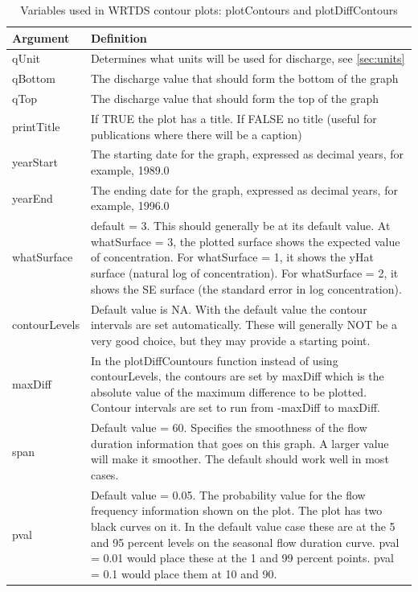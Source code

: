 \documentclass[a4paper,11pt]{article}\usepackage{graphicx, color}
\begin{document}
\begin{table}[ht]
\caption{Variables used in WRTDS contour plots: plotContours and plotDiffContours \label{tab:wrtdsContourVariables}}
\begin{tabularx}{\textwidth}{lX}
\hline
  \textbf{Argument} & \textbf{Definition} \\
\hline
qUnit & Determines what units will be used for discharge, see \ref{sec:units}\\
qBottom & The discharge value that should form the bottom of the graph \\
qTop & The discharge value that should form the top of the graph \\
printTitle & If TRUE the plot has a title.  If FALSE no title (useful for publications where there will be a caption) \\
yearStart & The starting date for the graph, expressed as decimal years, for example, 1989.0 \\
yearEnd & The ending date for the graph, expressed as decimal years, for example, 1996.0 \\
whatSurface & default = 3.  This should generally be at its default value.  At whatSurface = 3, the plotted surface shows the expected value of concentration.  For whatSurface = 1, it shows the yHat surface (natural log of concentration).  For whatSurface = 2, it shows the SE surface (the standard error in log concentration).    \\
contourLevels & Default value is NA.  With the default value the contour intervals are set automatically.  These will generally NOT be a very good choice, but they may provide a starting point.  \\
maxDiff & In the plotDiffCountours function instead of using contourLevels, the contours are set by maxDiff which is the absolute value of the maximum difference to be plotted.  Contour intervals are set to run from -maxDiff to maxDiff.\\
span & Default value = 60.  Specifies the smoothness of the flow duration information that goes on this graph.  A larger value will make it smoother.  The default should work well in most cases.\\
pval & Default value = 0.05.  The probability value for the flow frequency information shown on the plot.  The plot has two black curves on it.  In the default value case these are at the 5 and 95 percent levels on the seasonal flow duration curve.  pval = 0.01 would place these at the 1 and 99 percent points.  pval = 0.1 would place them at 10  and 90.\\

\end{tabularx}
\end{table}
\end{document}
